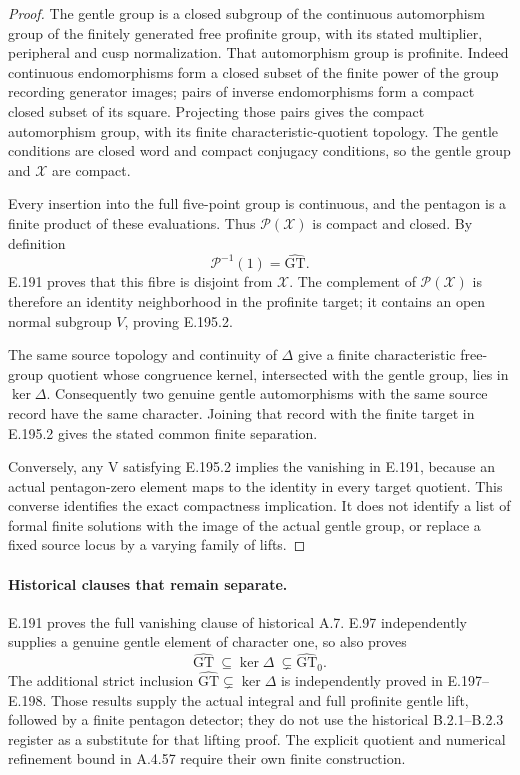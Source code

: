 \begin{proof}
The gentle group is a closed subgroup of the
continuous automorphism group of the finitely
generated free profinite group, with its stated
multiplier, peripheral and cusp normalization.
That automorphism group is profinite.  Indeed
continuous endomorphisms form a closed subset
of the finite power of the group recording
generator images; pairs of inverse endomorphisms
form a compact closed subset of its square.
Projecting those pairs gives the compact
automorphism group, with its finite
characteristic-quotient topology.
The gentle conditions are closed word and
compact conjugacy conditions, so the gentle
group and \(\mathcal X\) are compact.

Every insertion into the full five-point group
is continuous, and the pentagon is a finite
product of these evaluations.  Thus
\(\mathcal P(\mathcal X)\) is compact and closed.
By definition
\[
                \mathcal P^{-1}(1)
                         =\widehat{\mathrm{GT}}.
\tag{E.195.3}
\]
E.191 proves that this fibre is disjoint from
\(\mathcal X\).  The complement of
\(\mathcal P(\mathcal X)\) is therefore an
identity neighborhood in the profinite target;
it contains an open normal subgroup \(V\),
proving E.195.2.

The same source topology and continuity of
\(\Delta\) give a finite characteristic free-group
quotient whose congruence kernel, intersected
with the gentle group, lies in \(\ker\Delta\).
Consequently two genuine gentle automorphisms
with the same source record have the same
character.  Joining that record with the
finite target in E.195.2 gives the stated
common finite separation.

Conversely, any V satisfying E.195.2 implies
the vanishing in E.191, because an actual
pentagon-zero element maps to the identity
in every target quotient.  This converse
identifies the exact compactness implication.
It does not identify a list of formal finite
solutions with the image of the actual
gentle group, or replace a fixed source
locus by a varying family of lifts.
\end{proof}

\paragraph{Historical clauses that remain separate.}
E.191 proves the full vanishing clause of
historical A.7.  E.97 independently supplies
a genuine gentle element of character one,
so also proves
\[
 \widehat{\mathrm{GT}}\ \subseteq\ker\Delta
                    \ \subsetneq\widehat{\mathrm{GT}}_0 .
\]
The additional strict inclusion
\(\widehat{\mathrm{GT}}\subsetneq\ker\Delta\)
is independently proved in E.197--E.198.
Those results supply the actual integral and
full profinite gentle lift, followed by a
finite pentagon detector; they do not use
the historical B.2.1--B.2.3 register as a
substitute for that lifting proof.
The explicit quotient and numerical
refinement bound in A.4.57 require their
own finite construction.

